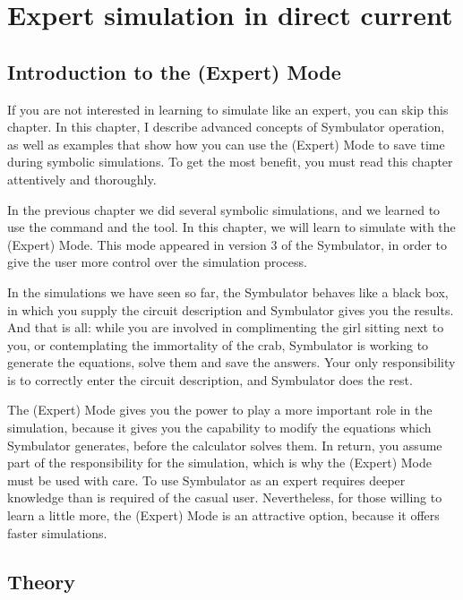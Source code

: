 
\chapter{Expert simulation in direct current}

\section{Introduction to the (Expert) Mode}

If you are not interested in learning to simulate like an expert,
you can skip this chapter. In this chapter, I describe advanced
concepts of Symbulator operation, as well as examples that show how
you can use the (Expert) Mode to save time during symbolic
simulations. To get the most benefit, you must read this chapter
attentively and thoroughly.

In the previous chapter we did several symbolic simulations, and we
learned to use the  command and the  tool.
In this chapter, we will learn to simulate with the (Expert) Mode.
This mode appeared in version 3 of the Symbulator, in order to give
the user more control over the simulation process.

In the simulations we have seen so far, the Symbulator behaves like
a black box, in which you supply the circuit description and
Symbulator gives you the results. And that is all: while you are
involved in complimenting the girl sitting next to you, or
contemplating the immortality of the crab, Symbulator is working to
generate the equations, solve them and save the answers. Your only
responsibility is to correctly enter the circuit description, and
Symbulator does the rest.

The (Expert) Mode gives you the power to play a more important role
in the simulation, because it gives you the capability to modify the
equations which Symbulator generates, before the calculator solves
them. In return, you assume part of the responsibility for the
simulation, which is why the (Expert) Mode must be used with care.
To use Symbulator as an expert requires deeper knowledge than is
required of the casual user. Nevertheless, for those willing to
learn a little more, the (Expert) Mode is an attractive option,
because it offers faster simulations.

\section{Theory}


